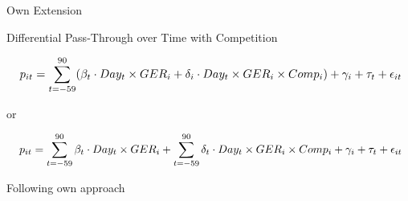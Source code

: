 




\begin{frame}{Own Extension}

\vspace{-1.cm}

\begin{block}{Differential Pass-Through over Time with Competition}

\small

\vspace{-0.3cm}

\begin{equation}
\resizebox{\textwidth}{!}{
$\displaystyle
p_{it} = \sum_{t=-59}^{90} (\beta_{t} \cdot Day_{t} \times GER_{i} + \delta_{i} \cdot Day_{t} \times GER_{i} \times Comp_{i}) + \gamma_{i} + \tau_{t} + \epsilon_{it}
$}
\label{eq:Diff_DiD4}
\end{equation}


\vspace{-0.2cm}

\begin{center}
    or
\end{center}

\vspace{-0.2cm}

\begin{equation}
\resizebox{\textwidth}{!}{
$\displaystyle
p_{it} = \sum_{t=-59}^{90} \beta_{t} \cdot Day_{t} \times GER_{i} + \sum_{t=-59}^{90} \delta_{t} \cdot Day_{t} \times GER_{i} \times Comp_{i} + \gamma_{i} + \tau_{t} + \epsilon_{it}
$}
\label{eq:Diff_DiD5}
\end{equation}

\vspace{0.2cm}

\begin{tiny}
    Following own approach
\end{tiny}

\end{block}

\end{frame}








